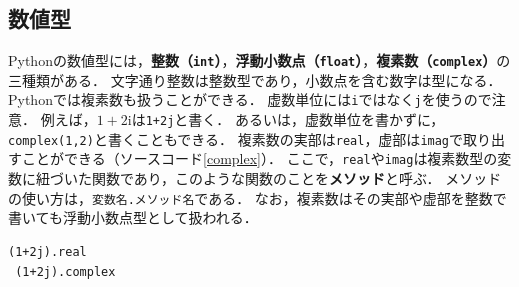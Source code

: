 \documentclass[a4paper,12pt]{jsarticle}
\begin{document}
\subsection{数値型}

Pythonの数値型には，{\bf 整数（\texttt{int}）}，{\bf 浮動小数点（\texttt{float}）}，{\bf 複素数（\texttt{complex}）}の三種類がある．
文字通り整数は整数型であり，小数点を含む数字は型になる．
Pythonでは複素数も扱うことができる．
虚数単位には\texttt{i}ではなく\texttt{j}を使うので注意．
例えば，$1+2\mathrm{i}$は\texttt{1+2j}と書く．
あるいは，虚数単位を書かずに，\texttt{complex(1,2)}と書くこともできる．
複素数の実部は\texttt{real}，虚部は\texttt{imag}で取り出すことができる（ソースコード\ref{complex}）．
ここで，\texttt{real}や\texttt{imag}は複素数型の変数に紐づいた関数であり，このような関数のことを{\bf メソッド}と呼ぶ．
メソッドの使い方は，\texttt{変数名.メソッド名}である．
なお，複素数はその実部や虚部を整数で書いても浮動小数点型として扱われる．
\begin{lstlisting}[caption=複素数の実部，虚部を取り出す,label=complex]
 (1+2j).real
 (1+2j).complex
\end{lstlisting}
\end{document}
